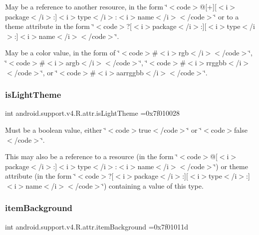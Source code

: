 May be a reference to another resource, in the form \char`\"{}$<$code$>$@\mbox{[}+\mbox{]}\mbox{[}$<$i$>$package$<$/i$>$\+:\mbox{]}$<$i$>$type$<$/i$>$\+:$<$i$>$name$<$/i$>$$<$/code$>$\char`\"{} or to a theme attribute in the form \char`\"{}$<$code$>$?\mbox{[}$<$i$>$package$<$/i$>$\+:\mbox{]}\mbox{[}$<$i$>$type$<$/i$>$\+:\mbox{]}$<$i$>$name$<$/i$>$$<$/code$>$\char`\"{}. 

May be a color value, in the form of \char`\"{}$<$code$>$\#$<$i$>$rgb$<$/i$>$$<$/code$>$\char`\"{}, \char`\"{}$<$code$>$\#$<$i$>$argb$<$/i$>$$<$/code$>$\char`\"{}, \char`\"{}$<$code$>$\#$<$i$>$rrggbb$<$/i$>$$<$/code$>$\char`\"{}, or \char`\"{}$<$code$>$\#$<$i$>$aarrggbb$<$/i$>$$<$/code$>$\char`\"{}. \mbox{\label{classandroid_1_1support_1_1v4_1_1R_1_1attr_a01391e8482aa0e5b8e409f2985a70c34}} 
\subsubsection{\texorpdfstring{is\+Light\+Theme}{isLightTheme}}
{\footnotesize\ttfamily int android.\+support.\+v4.\+R.\+attr.\+is\+Light\+Theme =0x7f010028\hspace{0.3cm}{\ttfamily [static]}}

Must be a boolean value, either \char`\"{}$<$code$>$true$<$/code$>$\char`\"{} or \char`\"{}$<$code$>$false$<$/code$>$\char`\"{}. 

This may also be a reference to a resource (in the form \char`\"{}$<$code$>$@\mbox{[}$<$i$>$package$<$/i$>$\+:\mbox{]}$<$i$>$type$<$/i$>$\+:$<$i$>$name$<$/i$>$$<$/code$>$\char`\"{}) or theme attribute (in the form \char`\"{}$<$code$>$?\mbox{[}$<$i$>$package$<$/i$>$\+:\mbox{]}\mbox{[}$<$i$>$type$<$/i$>$\+:\mbox{]}$<$i$>$name$<$/i$>$$<$/code$>$\char`\"{}) containing a value of this type. \mbox{\label{classandroid_1_1support_1_1v4_1_1R_1_1attr_aa406a89c6cbd17dba970776ae457d426}} 
\subsubsection{\texorpdfstring{item\+Background}{itemBackground}}
{\footnotesize\ttfamily int android.\+support.\+v4.\+R.\+attr.\+item\+Background =0x7f01011d\hspace{0.3cm}{\ttfamily [static]}}

